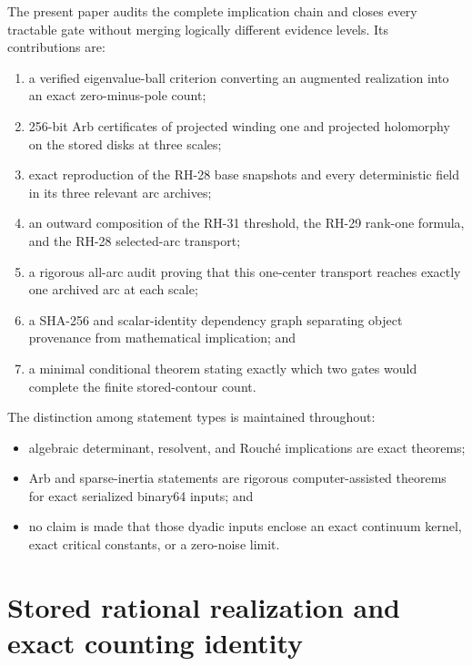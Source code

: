 \documentclass[11pt]{article}
\theoremstyle{definition}
\theoremstyle{remark}
\begin{document}
The present paper audits the complete implication chain and closes every
tractable gate without merging logically different evidence levels.  Its
contributions are:

\begin{enumerate}
 \item a verified eigenvalue-ball criterion converting an augmented
       realization into an exact zero-minus-pole count;
 \item 256-bit Arb certificates of projected winding one and projected
       holomorphy on the stored disks at three scales;
 \item exact reproduction of the RH-28 base snapshots and every
       deterministic field in its three relevant arc archives;
 \item an outward composition of the RH-31 threshold, the RH-29 rank-one
       formula, and the RH-28 selected-arc transport;
 \item a rigorous all-arc audit proving that this one-center transport
       reaches exactly one archived arc at each scale;
 \item a SHA-256 and scalar-identity dependency graph separating object
       provenance from mathematical implication; and
 \item a minimal conditional theorem stating exactly which two gates would
       complete the finite stored-contour count.
\end{enumerate}

The distinction among statement types is maintained throughout:

\begin{itemize}
 \item algebraic determinant, resolvent, and Rouch\'e implications are exact
       theorems;
 \item Arb and sparse-inertia statements are rigorous computer-assisted
       theorems for exact serialized binary64 inputs; and
 \item no claim is made that those dyadic inputs enclose an exact continuum
       kernel, exact critical constants, or a zero-noise limit.
\end{itemize}


\section{Stored rational realization and exact counting identity}
\label{sec:realization}
\end{document}
